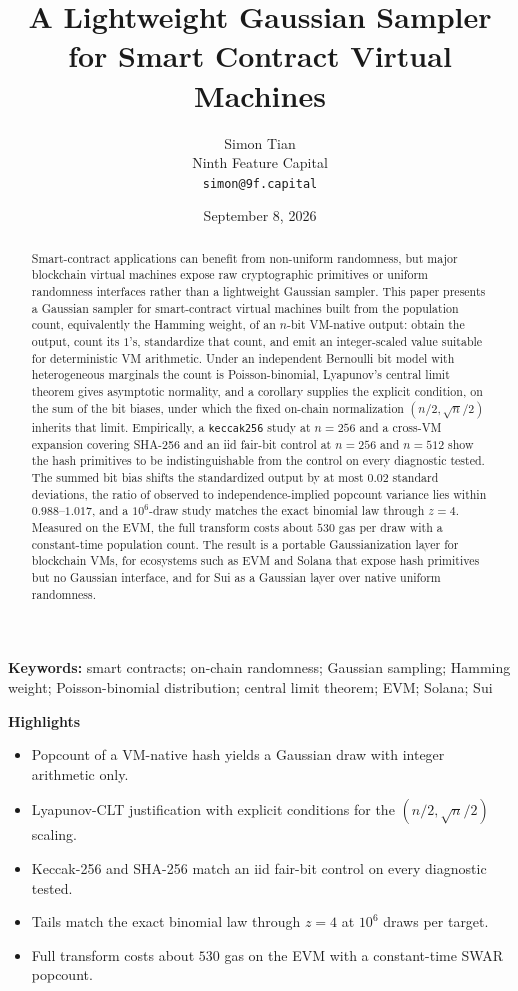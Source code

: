 \documentclass[11pt]{article}
\title{A Lightweight Gaussian Sampler for Smart Contract Virtual Machines}
\author{Simon Tian\\
Ninth Feature Capital\\
\texttt{simon@9f.capital}}
\date{September 8, 2026}
\begin{document}
\maketitle

\begin{abstract}
Smart-contract applications can benefit from non-uniform randomness, but major
blockchain virtual machines expose raw cryptographic primitives or uniform
randomness interfaces rather than a lightweight Gaussian sampler. This paper
presents a Gaussian sampler for smart-contract virtual machines built from the
population count, equivalently the Hamming weight, of an $n$-bit VM-native
output: obtain the output, count its $1$'s, standardize that count, and emit an
integer-scaled value suitable for deterministic VM arithmetic. Under an
independent Bernoulli bit model with heterogeneous marginals the count is
Poisson-binomial, Lyapunov's central limit theorem gives asymptotic normality,
and a corollary supplies the explicit condition, on the sum of the bit biases,
under which the fixed on-chain normalization $(n/2,\sqrt{n}/2)$ inherits that
limit. Empirically, a \texttt{keccak256} study at $n=256$ and a cross-VM
expansion covering SHA-256 and an iid fair-bit control at $n=256$ and $n=512$
show the hash primitives to be indistinguishable from the control on every
diagnostic tested. The summed bit bias shifts the standardized output by at
most $0.02$ standard deviations, the ratio of observed to independence-implied
popcount variance lies within $0.988$--$1.017$, and a $10^{6}$-draw study
matches the exact binomial law through $z=4$. Measured on the EVM, the full
transform costs about $530$ gas per draw with a constant-time population count.
The result is a portable Gaussianization layer for blockchain VMs, for
ecosystems such as EVM and Solana that expose hash primitives but no Gaussian
interface, and for Sui as a Gaussian layer over native uniform randomness.
\end{abstract}

\noindent\textbf{Keywords:} smart contracts; on-chain randomness; Gaussian
sampling; Hamming weight; Poisson-binomial distribution; central limit
theorem; EVM; Solana; Sui

\medskip
\noindent\textbf{Highlights}
\begin{itemize}
\item Popcount of a VM-native hash yields a Gaussian draw with integer arithmetic only.
\item Lyapunov-CLT justification with explicit conditions for the $(n/2,\sqrt{n}/2)$ scaling.
\item Keccak-256 and SHA-256 match an iid fair-bit control on every diagnostic tested.
\item Tails match the exact binomial law through $z=4$ at $10^{6}$ draws per target.
\item Full transform costs about $530$ gas on the EVM with a constant-time SWAR popcount.
\end{itemize}
\end{document}
